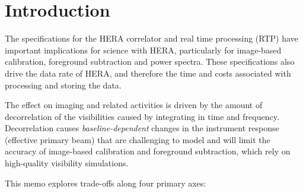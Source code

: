 \documentclass{article}
\begin{document}
\newpage
\section*{Introduction}
The specifications for the HERA correlator and real time processing (RTP) have important implications for science with HERA, 
particularly for image-based calibration, foreground subtraction and power spectra. 
These specifications also drive the data rate of HERA, and therefore the time and costs associated with processing and storing the data.

The effect on imaging and related activities is driven by the amount of decorrelation of the visibilities caused by integrating in time and frequency. 
Decorrelation causes \textit{baseline-dependent} changes in the instrument response (effective primary beam) that are challenging to model and will 
limit the accuracy of image-based calibration and foreground subtraction, which rely on high-quality visibility simulations. 

This memo explores trade-offs along four primary axes:
\end{document}
